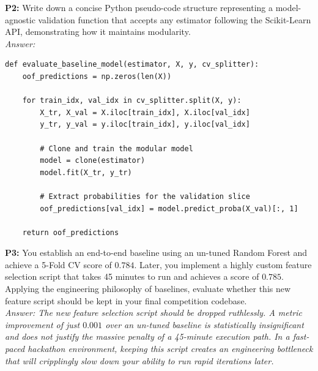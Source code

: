 \documentclass{article}
\begin{document}
\newline
\textbf{P2:} Write down a concise Python pseudo-code structure representing a model-agnostic validation function that accepts any estimator following the Scikit-Learn API, demonstrating how it maintains modularity.
\\
\textit{Answer:}
\begin{verbatim}
def evaluate_baseline_model(estimator, X, y, cv_splitter):
    oof_predictions = np.zeros(len(X))

    for train_idx, val_idx in cv_splitter.split(X, y):
        X_tr, X_val = X.iloc[train_idx], X.iloc[val_idx]
        y_tr, y_val = y.iloc[train_idx], y.iloc[val_idx]

        # Clone and train the modular model
        model = clone(estimator)
        model.fit(X_tr, y_tr)

        # Extract probabilities for the validation slice
        oof_predictions[val_idx] = model.predict_proba(X_val)[:, 1]

    return oof_predictions
\end{verbatim}

\newline
\textbf{P3:} You establish an end-to-end baseline using an un-tuned Random Forest and achieve a 5-Fold CV score of $0.784$. Later, you implement a highly custom feature selection script that takes 45 minutes to run and achieves a score of $0.785$. Applying the engineering philosophy of baselines, evaluate whether this new feature script should be kept in your final competition codebase.
\\
\textit{Answer: The new feature selection script should be dropped ruthlessly. A metric improvement of just $0.001$ over an un-tuned baseline is statistically insignificant and does not justify the massive penalty of a 45-minute execution path. In a fast-paced hackathon environment, keeping this script creates an engineering bottleneck that will cripplingly slow down your ability to run rapid iterations later.}
\end{document}
